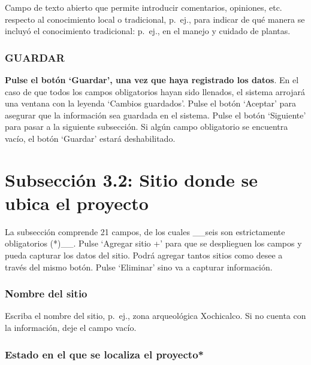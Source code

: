\documentclass[
]{book}
\begin{document}
Campo de texto abierto que permite introducir comentarios, opiniones, etc. respecto al conocimiento local o tradicional, p.~ej., para indicar de qué manera se incluyó el conocimiento tradicional: p.~ej., en el manejo y cuidado de plantas.

\hypertarget{guardar-3}{%
\subsection{GUARDAR}\label{guardar-3}}

\textbf{Pulse el botón `Guardar', una vez que haya registrado los datos}.
En el caso de que todos los campos obligatorios hayan sido llenados, el sistema arrojará una ventana con la leyenda `Cambios guardados'. Pulse el botón `Aceptar' para asegurar que la información sea guardada en el sistema.
Pulse el botón `Siguiente' para pasar a la siguiente subsección.
Si algún campo obligatorio se encuentra vacío, el botón `Guardar' estará deshabilitado.

\hypertarget{subsecciuxf3n-3.2-sitio-donde-se-ubica-el-proyecto}{%
\chapter*{Subsección 3.2: Sitio donde se ubica el proyecto}\label{subsecciuxf3n-3.2-sitio-donde-se-ubica-el-proyecto}}

La subsección comprende 21 campos, de los cuales \_\_seis son estrictamente obligatorios (*)\_\_.
Pulse `Agregar sitio +' para que se desplieguen los campos y pueda capturar los datos del sitio. Podrá agregar tantos sitios como desee a través del mismo botón.
Pulse `Eliminar' sino va a capturar información.

\hypertarget{nombre-del-sitio}{%
\subsection{Nombre del sitio}\label{nombre-del-sitio}}

Escriba el nombre del sitio, p.~ej., zona arqueológica Xochicalco.
Si no cuenta con la información, deje el campo vacío.

\hypertarget{estado-en-el-que-se-localiza-el-proyecto}{%
\subsection{Estado en el que se localiza el proyecto*}\label{estado-en-el-que-se-localiza-el-proyecto}}
\end{document}
